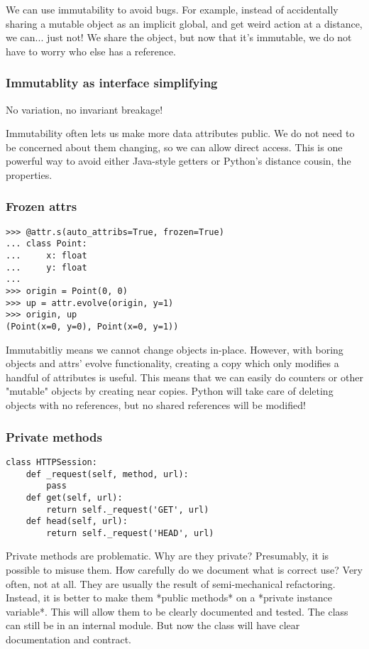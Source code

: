 We can use immutability to avoid bugs.
For example,
instead of accidentally sharing a mutable object
as an implicit global,
and get weird action at a distance,
we can...
just not!
We share the object,
but now that it's immutable,
we do not have to worry who else has a reference.

\begin{frame}[fragile]
\frametitle{Immutablity as interface simplifying}

No variation, no invariant breakage!
\end{frame}

Immutability often lets us make more data attributes public.
We do not need to be concerned about them changing,
so we can allow direct access.
This is one powerful way to avoid either Java-style
getters
or Python's distance cousin,
the properties.

\begin{frame}[fragile]
\frametitle{Frozen attrs}

\begin{lstlisting}
>>> @attr.s(auto_attribs=True, frozen=True)
... class Point:
...     x: float
...     y: float
... 
>>> origin = Point(0, 0)
>>> up = attr.evolve(origin, y=1)
>>> origin, up
(Point(x=0, y=0), Point(x=0, y=1))
\end{lstlisting}

\end{frame}

Immutabitliy means we cannot change objects in-place.
However,
with boring objects
and attrs' evolve functionality,
creating a copy which only modifies a handful of attributes is useful.
This means that we can easily do counters or other
"mutable" objects
by creating near copies.
Python will take care of deleting objects with no references,
but no shared references will be modified!

\begin{frame}[fragile]
\frametitle{Private methods}

\begin{lstlisting}
class HTTPSession:
    def _request(self, method, url):
        pass
    def get(self, url):
        return self._request('GET', url)
    def head(self, url):
        return self._request('HEAD', url)
\end{lstlisting}
    
\end{frame}

Private methods are problematic.
Why are they private?
Presumably,
it is possible to misuse them.
How carefully do we document what is correct use?
Very often,
not at all.
They are usually the result of semi-mechanical refactoring.
Instead,
it is better to make them
*public methods*
on a
*private instance variable*.
This will allow them to be clearly documented and tested.
The class can still be in an internal module.
But now the class will have clear documentation
and contract.

